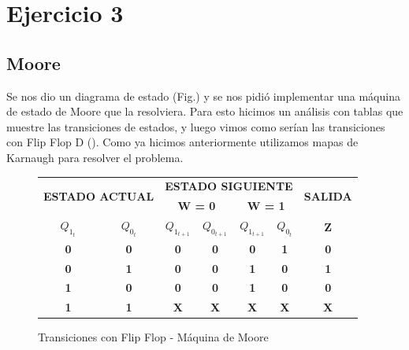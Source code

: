 \documentclass[10pt,a4paper]{article}
\begin{document}
\section{Ejercicio 3}
\subsection{Moore}
Se nos dio un diagrama de estado (Fig.) y se nos pidió implementar una máquina de estado de Moore que la resolviera. Para esto hicimos un análisis con tablas que muestre las transiciones de estados, y luego vimos como serían las transiciones con Flip Flop D (). Como ya hicimos anteriormente utilizamos mapas de Karnaugh para resolver el problema. 


\begin{figure}[hbtp]
	\begin{center}
		\begin{tabular}{|c|c|c|c|c|c|c|}
\hline
\multicolumn{2}{|c|}{\multirow{2}{*}{\textbf{ESTADO ACTUAL}}} & \multicolumn{4}{c|}{\textbf{ESTADO SIGUIENTE}} & \multirow{2}{*}{\textbf{SALIDA}} \\ \cline{3-6}
\multicolumn{2}{|c|}{} & \multicolumn{2}{c|}{\textbf{W = 0}} & \multicolumn{2}{c|}{\textbf{W = 1}} &  \\ \hline
\textbf{$Q_{1_{t}}$} & \textbf{$Q_{0_{t}}$} & \textbf{$Q_{1_{t+1}}$} & \textbf{$Q_{0_{t+1}}$} & \textbf{$Q_{1_{t+1}}$} & \textbf{$Q_{0_{t}}$} & \textbf{Z} \\ \hline
\textbf{0} & \textbf{0} & \textbf{0} & \textbf{0} & \textbf{0} & \textbf{1} & \textbf{0} \\ \hline
\textbf{0} & \textbf{1} & \textbf{0} & \textbf{0} & \textbf{1} & \textbf{0} & \textbf{1} \\ \hline
\textbf{1} & \textbf{0} & \textbf{0} & \textbf{0} & \textbf{1} & \textbf{0} & \textbf{0} \\ \hline
\textbf{1} & \textbf{1} & \textbf{X} & \textbf{X} & \textbf{X} & \textbf{X} & \textbf{X} \\ \hline
		\end{tabular}
		\caption{Transiciones con Flip Flop - Máquina de Moore} 
		\label{3_fig2}
	\end{center}
\end{figure}






\end{document}
